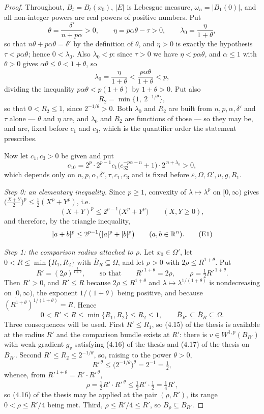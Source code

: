 \begin{proof}
Throughout, $B_t=B_t(x_0)$, $|E|$ is Lebesgue measure, $\omega_n=|B_1(0)|$, and
all non-integer powers are real powers of positive numbers.  Put
\[
\theta=\frac{\delta'}{n+p\alpha}>0,
\qquad
\eta=p\alpha\theta-\tau>0,
\qquad
\lambda_0=\frac\eta{1+\theta},
\]
so that $n\theta+p\alpha\theta=\delta'$ by the definition of $\theta$, and
$\eta>0$ is exactly the hypothesis $\tau<p\alpha\theta$; hence $0<\lambda_0$.
Also $\lambda_0<p$: since $\tau>0$ we have $\eta<p\alpha\theta$, and
$\alpha\le1$ with $\theta>0$ gives $\alpha\theta\le\theta<1+\theta$, so
\[
\lambda_0=\frac\eta{1+\theta}<\frac{p\alpha\theta}{1+\theta}<p ,
\]
dividing the inequality $p\alpha\theta<p(1+\theta)$ by $1+\theta>0$.  Put also
\[
R_2=\min\bigl\{1,\ 2^{-1/\theta}\bigr\},
\]
so that $0<R_2\le1$, since $2^{-1/\theta}>0$.  Both $\lambda_0$ and $R_2$ are
built from $n,p,\alpha,\delta'$ and $\tau$ alone --- $\theta$ and $\eta$ are,
and $\lambda_0$ and $R_2$ are functions of those --- so they may be, and are,
fixed before $c_1$ and $c_3$, which is the quantifier order the statement
prescribes.

Now let $c_1,c_3>0$ be given and put
\[
c_{10}=2^{p}\cdot2^{p-1}c_1\bigl(c_32^{-p\alpha-n}+1\bigr)\cdot2^{\,n+\lambda_0}>0 ,
\]
which depends only on $n,p,\alpha,\delta',\tau,c_1,c_3$ and is fixed before
$\varepsilon,\Omega,\Omega',u,g,R_1$.

\emph{Step 0: an elementary inequality.}  Since $p\ge1$, convexity of
$\lambda\mapsto\lambda^{p}$ on $[0,\infty)$ gives
$\bigl(\frac{X+Y}2\bigr)^{p}\le\frac12(X^{p}+Y^{p})$, i.e.
\[
(X+Y)^{p}\le2^{p-1}\bigl(X^{p}+Y^{p}\bigr)\qquad(X,Y\ge0),
\]
and therefore, by the triangle inequality,
\[
|a+b|^{p}\le2^{p-1}\bigl(|a|^{p}+|b|^{p}\bigr)\qquad(a,b\in\mathbb{R}^n).
\tag{E1}
\]

\emph{Step 1: the comparison radius attached to $\rho$.}  Let $x_0\in\Omega'$,
let $0<R\le\min\{R_1,R_2\}$ with $\overline B_R\subseteq\Omega$, and let
$\rho>0$ with $2\rho\le R^{1+\theta}$.  Put
\[
R'=(2\rho)^{\frac1{1+\theta}},\qquad\text{so that}\qquad
R'^{\,1+\theta}=2\rho,\qquad \rho=\tfrac12R'^{\,1+\theta}.
\]
Then $R'>0$, and $R'\le R$ because $2\rho\le R^{1+\theta}$ and
$\lambda\mapsto\lambda^{1/(1+\theta)}$ is nondecreasing on $[0,\infty)$, the
exponent $1/(1+\theta)$ being positive, and because
$(R^{1+\theta})^{1/(1+\theta)}=R$.  Hence
\[
0<R'\le R\le\min\{R_1,R_2\}\le R_2\le1,
\qquad
\overline B_{R'}\subseteq\overline B_R\subseteq\Omega .
\]
Three consequences will be used.  First $R'\le R_1$, so (4.15) of the thesis is
available at the radius $R'$ and the comparison bundle exists at $R'$: there is
$v\in W^{1,p}(B_{R'})$ with weak gradient $g_v$ satisfying (4.16) of the thesis and
(4.17) of the thesis on $B_{R'}$.  Second $R'\le R_2\le2^{-1/\theta}$, so, raising to
the power $\theta>0$,
\[
R'^{\,\theta}\le\bigl(2^{-1/\theta}\bigr)^{\theta}=2^{-1}=\tfrac12 ,
\]
whence, from $R'^{\,1+\theta}=R'\cdot R'^{\,\theta}$,
\[
\rho=\tfrac12R'\cdot R'^{\,\theta}\le\tfrac12R'\cdot\tfrac12=\tfrac14R' ,
\]
so (4.16) of the thesis may be applied at the pair $(\rho,R')$, its range
$0<\rho\le R'/4$ being met.  Third, $\rho\le R'/4\le R'$, so
$B_\rho\subseteq B_{R'}$.


\end{proof}
